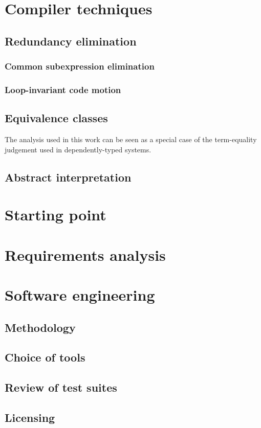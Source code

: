 \section{Compiler techniques}

\subsection{Redundancy elimination}

\subsubsection{Common subexpression elimination}

\subsubsection{Loop-invariant code motion}

\subsection{Equivalence classes}

The analysis used in this work can be seen as a special case of the term-equality judgement used in dependently-typed systems.

\subsection{Abstract interpretation}

\section{Starting point}

\section{Requirements analysis}

\section{Software engineering}

\subsection{Methodology}

\subsection{Choice of tools}

\subsection{Review of test suites}

\subsection{Licensing}
